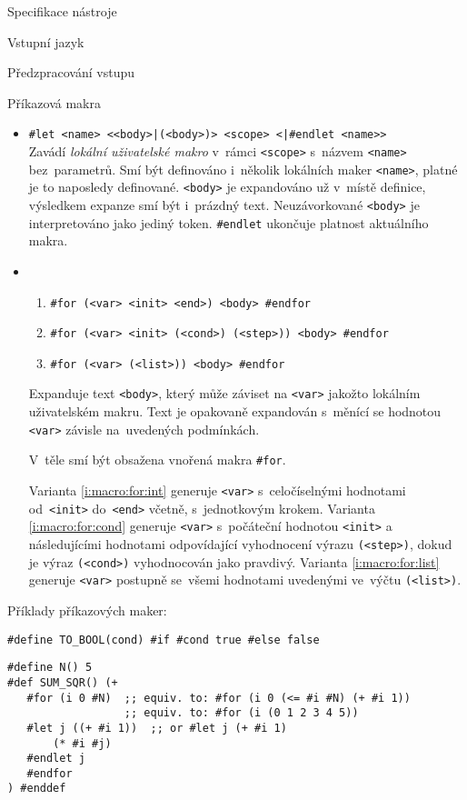 \documentclass[thesis=M,czech]{FITthesis}[2012/06/26]
\newcommand{\id}[1]{\texttt{#1}}
\newcommand{\hl}[1]{\textit{#1}}
\newcommand{\rf}[1]{\ref{#1}}
\begin{document}
\begin{section}{Specifikace nástroje}
\begin{subsection}{Vstupní jazyk}
\begin{subsubsection}{Předzpracování vstupu}
\begin{paragraph}{Příkazová makra}
\begin{itemize}
   Ve~variantě \rf{i:macro:def:def} může být tělo i~víceřádkové;
   varianta \rf{i:macro:def:define} je zakončena koncem řádku.
\item \id{\#let <name> <{}<body>|(<body>)> <scope> <|\#endlet <name>{}>} \\
   Zavádí \hl{lokální uživatelské makro}
   v~rámci \id{<scope>} s~názvem \id{<name>}
   bez~parametrů. Smí být definováno i~několik lokálních maker \id{<name>},
   platné je to naposledy definované.
   \id{<body>} je expandováno už v~místě definice,
   výsledkem expanze smí být i~prázdný text.
   Neuzávorkované \id{<body>} je interpretováno jako jediný token.
   \id{\#endlet} ukončuje platnost aktuálního makra.
\item
   \begin{enumerate}
   \item \label{i:macro:for:int}
      \id{\#for (<var> <init> <end>) <body> \#endfor}
   \item \label{i:macro:for:cond}
      \id{\#for (<var> <init> (<cond>) (<step>)) <body> \#endfor}
   \item \label{i:macro:for:list}
      \id{\#for (<var> (<list>)) <body> \#endfor}
   \end{enumerate}
   Expanduje text \id{<body>}, který může záviset na \id{<var>}
   jakožto lokálním uživatelském makru.
   Text je opakovaně expandován s~měnící se hodnotou \id{<var>}
   závisle na~uvedených podmínkách.

   V~těle smí být obsažena vnořená makra \id{\#for}.

   Varianta \rf{i:macro:for:int} generuje \id{<var>}
   s~celočíselnými hodnotami od~\id{<init>} do~\id{<end>} včetně,
   s~jednotkovým krokem.
   Varianta \rf{i:macro:for:cond} generuje \id{<var>}
   s~počáteční hodnotou \id{<init>} a následujícími hodnotami
   odpovídající vyhodnocení výrazu \id{(<step>)},
   dokud je výraz \id{(<cond>)} vyhodnocován jako pravdivý.
   Varianta \rf{i:macro:for:list} generuje \id{<var>}
   postupně se~všemi hodnotami uvedenými ve~výčtu \id{(<list>)}.
\end{itemize}

Příklady příkazových maker:
\begin{Verbatim}
#define TO_BOOL(cond) #if #cond true #else false
\end{Verbatim}
\begin{Verbatim}[samepage=true]
#define N() 5
#def SUM_SQR() (+
   #for (i 0 #N)  ;; equiv. to: #for (i 0 (<= #i #N) (+ #i 1))
                  ;; equiv. to: #for (i (0 1 2 3 4 5))
   #let j ((+ #i 1))  ;; or #let j (+ #i 1)
       (* #i #j)
   #endlet j
   #endfor
) #enddef
\end{Verbatim}
\end{paragraph} %


\end{subsubsection}
\end{subsection}
\end{section}
\end{document}
